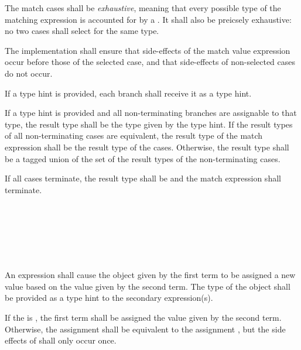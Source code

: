 \specsubsubitem
The match cases shall be \textit{exhaustive}, meaning that every possible type
of the matching expression is accounted for by a . It
shall also be preicsely exhaustive: no two cases shall select for the same
type.

\specsubsubitem
The implementation shall ensure that side-effects of the match value
expression occur before those of the selected case, and that side-effects of
non-selected cases do not occur.

\specsubsubitem
If a type hint is provided, each branch shall receive it as a type hint.

\specsubsubitem
If a type hint is provided and all non-terminating branches are assignable to
that type, the result type shall be the type given by the type hint. If the
result types of all non-terminating cases are equivalent, the result type of
the match expression shall be the result type of the cases. Otherwise, the
result type shall be a tagged union of the set of the result types of the
non-terminating cases.

If all cases terminate, the result type shall be  and the match
expression shall terminate.


\begin{grammar}
 \\
	   \\
	\terminal{*}    \\
	 \terminal{=}  \\

 \oneof \\
	\terminal{=}
	\terminal{+=}
	\terminal{-=}
	\terminal{*=}
	\terminal{/=}
	\terminal{\%=}
	\terminal{\textless{}\textless{}=}
	\terminal{\textgreater{}\textgreater{}=}
	\terminal{\&=}
	\terminal{|=}
	\terminal{\textasciicircum=}
\end{grammar}

\specsubsubitem
An  expression shall cause the object given by the
first term to be assigned a new value based on the value given by the second
term. The type of the object shall be provided as a type hint to the secondary
expression(s).

\specsubsubitem
If the  is \terminal{=}, the first term shall be
assigned the value given by the second term. Otherwise, the assignment
 shall be
equivalent to the assignment
,
but the side effects of  shall only occur once.


